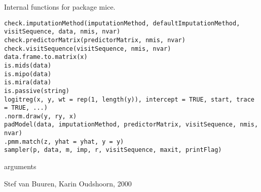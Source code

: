 \begin{Description}\relax
Internal functions for package mice.
\end{Description}
\begin{Usage}
\begin{verbatim}
check.imputationMethod(imputationMethod, defaultImputationMethod, visitSequence, data, nmis, nvar)
check.predictorMatrix(predictorMatrix, nmis, nvar)
check.visitSequence(visitSequence, nmis, nvar)
data.frame.to.matrix(x)
is.mids(data)
is.mipo(data)
is.mira(data)
is.passive(string)
logitreg(x, y, wt = rep(1, length(y)), intercept = TRUE, start, trace = TRUE, ...)
.norm.draw(y, ry, x)
padModel(data, imputationMethod, predictorMatrix, visitSequence, nmis, nvar)
.pmm.match(z, yhat = yhat, y = y)
sampler(p, data, m, imp, r, visitSequence, maxit, printFlag)
\end{verbatim}
\end{Usage}
\begin{Arguments}
\begin{ldescription}
\item[\code{imputationMethod, defaultImputationMethod, visitSequence, data, nmis, nvar,
predictorMatrix, x, y, ry, string, wt, intercept, start, trace, z, yhat, p, m,
imp, r, maxit, printFlag, ...}] arguments
\end{ldescription}
\end{Arguments}
\begin{Author}\relax
Stef van Buuren, Karin Oudshoorn, 2000
\end{Author}


